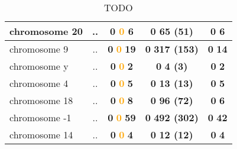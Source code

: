 \begin{table}[H]
\begin{tabular}{||l|c|c|c|c||}
\hline
chromosome 20&..&\textcolor{vert}{\textbf{0}} \textcolor{orange}{\textbf{0}} \textcolor{rose}{\textbf{6}} &\textcolor{vert}{\textbf{0}} \textcolor{rose}{\textbf{65 (51)}} &\textcolor{vert}{\textbf{0}} \textcolor{rose}{\textbf{6}} \\
\hline
chromosome 9&..&\textcolor{vert}{\textbf{0}} \textcolor{orange}{\textbf{0}} \textcolor{rose}{\textbf{19}} &\textcolor{vert}{\textbf{0}} \textcolor{rose}{\textbf{317 (153)}} &\textcolor{vert}{\textbf{0}} \textcolor{rose}{\textbf{14}} \\
\hline
chromosome y&..&\textcolor{vert}{\textbf{0}} \textcolor{orange}{\textbf{0}} \textcolor{rose}{\textbf{2}} &\textcolor{vert}{\textbf{0}} \textcolor{rose}{\textbf{4 (3)}} &\textcolor{vert}{\textbf{0}} \textcolor{rose}{\textbf{2}} \\
\hline
chromosome 4&..&\textcolor{vert}{\textbf{0}} \textcolor{orange}{\textbf{0}} \textcolor{rose}{\textbf{5}} &\textcolor{vert}{\textbf{0}} \textcolor{rose}{\textbf{13 (13)}} &\textcolor{vert}{\textbf{0}} \textcolor{rose}{\textbf{5}} \\
\hline
chromosome 18&..&\textcolor{vert}{\textbf{0}} \textcolor{orange}{\textbf{0}} \textcolor{rose}{\textbf{8}} &\textcolor{vert}{\textbf{0}} \textcolor{rose}{\textbf{96 (72)}} &\textcolor{vert}{\textbf{0}} \textcolor{rose}{\textbf{6}} \\
\hline
chromosome -1&..&\textcolor{vert}{\textbf{0}} \textcolor{orange}{\textbf{0}} \textcolor{rose}{\textbf{59}} &\textcolor{vert}{\textbf{0}} \textcolor{rose}{\textbf{492 (302)}} &\textcolor{vert}{\textbf{0}} \textcolor{rose}{\textbf{42}} \\
\hline
chromosome 14&..&\textcolor{vert}{\textbf{0}} \textcolor{orange}{\textbf{0}} \textcolor{rose}{\textbf{4}} &\textcolor{vert}{\textbf{0}} \textcolor{rose}{\textbf{12 (12)}} &\textcolor{vert}{\textbf{0}} \textcolor{rose}{\textbf{4}} \\
\hline
\hline
		\end{tabular}
	\caption{TODO}
	\label{tab:TODO}
\end{table}